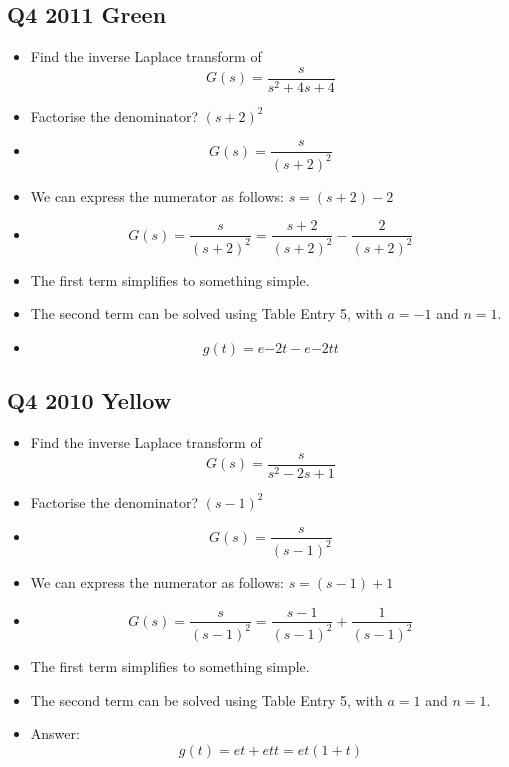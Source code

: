 \documentclass[11pt,a4paper,titlepage,oneside,openany]{article}
\numberwithin{equation}{section}
\numberwithin{algorithm}{section}
\numberwithin{figure}{section}
\numberwithin{table}{section}
\begin{document}
\subsection*{Q4 2011 Green}
\begin{itemize}
\item Find the inverse Laplace transform of
\[ G(s) = \frac{s}{s^2 + 4s + 4} \]
\item Factorise the denominator?  $(s+2)^2$
\item
\[ G(s) = \frac{s}{(s+2)^2} \]
\item We can express the numerator as follows:  $s = (s+2)-2$
\item
\[ G(s) = \frac{s}{(s+2)^2} =  \frac{s+2}{(s+2)^2} - \frac{2}{(s+2)^2} \]
\item The first term simplifies to something simple.
\item The second term can be solved using Table Entry 5, with $a=-1$ and $n=1$.
\item
\[ g(t)  = e{-2t} - e{-2t}t \]
\end{itemize}

\subsection*{Q4 2010 Yellow}

\begin{itemize}
\item Find the inverse Laplace transform of
\[ G(s) = \frac{s}{s^2 -2s + 1} \]
\item Factorise the denominator?  $(s-1)^2$
\item
\[ G(s) = \frac{s}{(s-1)^2} \]
\item We can express the numerator as follows:  $s = (s-1)+1$
\item
\[ G(s) = \frac{s}{(s-1)^2} =  \frac{s-1}{(s-1)^2} + \frac{1}{(s-1)^2} \]
\item The first term simplifies to something simple.
\item The second term can be solved using Table Entry 5, with $a=1$ and $n=1$.
\item Answer:
\[ g(t)  = e{t} + e{t}t = e{t}(1+t)  \]

\end{itemize}
\end{document}
